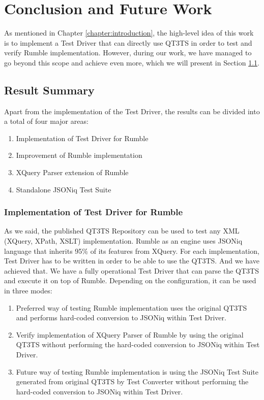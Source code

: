 \chapter{Conclusion and Future Work} 
\label{chapter:conclusions}
As mentioned in Chapter \ref{chapter:introduction}, the high-level idea of this work is to implement a Test Driver that can directly use QT3TS in order to test and verify Rumble implementation. However, during our work, we have managed to go beyond this scope and achieve even more, which we will present in Section \ref{sec:overallsummary}.

\section{Result Summary}
\label{sec:overallsummary}
Apart from the implementation of the Test Driver, the results can be divided into a total of four major areas:
\begin{enumerate}
	\item Implementation of Test Driver for Rumble
	\item Improvement of Rumble implementation
	\item XQuery Parser extension of Rumble
	\item Standalone JSONiq Test Suite
\end{enumerate}

\subsection{Implementation of Test Driver for Rumble}
As we said, the published QT3TS Repository \cite{TestSuiteGitHubRepository} can be used to test any XML (XQuery, XPath, XSLT) implementation. Rumble as an engine uses JSONiq language that inherits 95\% of its features from XQuery. For each implementation, Test Driver has to be written in order to be able to use the QT3TS. And we have achieved that. We have a fully operational Test Driver that can parse the QT3TS and execute it on top of Rumble. Depending on the configuration, it can be used in three modes:
\begin{enumerate}
	\item Preferred way of testing Rumble implementation uses the original QT3TS and performs hard-coded conversion to JSONiq within Test Driver.
	\item  Verify implementation of XQuery Parser of Rumble by using the original QT3TS without performing the hard-coded conversion to JSONiq within Test Driver.
	\item Future way of testing Rumble implementation is using the JSONiq Test Suite generated from original QT3TS by Test Converter without performing the hard-coded conversion to JSONiq within Test Driver.
\end{enumerate} 

